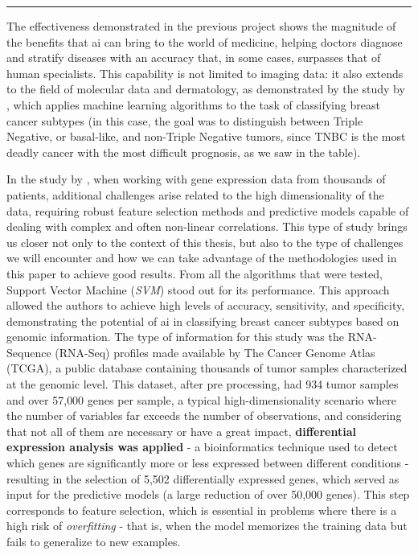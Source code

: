 \noindent\rule{\linewidth}{0.4pt}

The effectiveness demonstrated in the previous project shows the magnitude of
the benefits that \gls{ai} can bring to the world of medicine, helping doctors
diagnose and stratify diseases with an accuracy that, in some cases, surpasses
that of human specialists. This capability is not limited to imaging data: it
also extends to the field of molecular data and dermatology, as demonstrated by
the study by \textcite{bca_subtypes_with_ml_Wu_2021}, which applies machine
learning algorithms to the task of classifying breast cancer subtypes (in this
case, the goal was to distinguish between Triple Negative, or basal-like, and
non-Triple Negative tumors, since TNBC is the most deadly cancer with the most
difficult prognosis, as we saw in the table).

In the study by \textcite{bca_subtypes_with_ml_Wu_2021}, when working with gene
expression data from thousands of patients, additional challenges arise related
to the high dimensionality of the data, requiring robust feature selection
methods and predictive models capable of dealing with complex and often
non-linear correlations. This type of study brings us closer not only to the
context of this thesis, but also to the type of challenges we will encounter
and how we can take advantage of the methodologies used in this paper to
achieve good results. From all the algorithms that were tested, Support Vector
Machine (\textit{SVM}) stood out for its performance. This approach allowed the
authors to achieve high levels of accuracy, sensitivity, and specificity,
demonstrating the potential of \gls{ai} in classifying breast cancer subtypes
based on genomic information. The type of information for this study was the
RNA-Sequence (RNA-Seq) profiles made available by The Cancer Genome Atlas
(TCGA), a public database containing thousands of tumor samples characterized
at the genomic level. This dataset, after pre processing, had 934 tumor samples
and over 57{,}000 genes per sample, a typical high-dimensionality scenario
where the number of variables far exceeds the number of observations, and
considering that not all of them are necessary or have a great impact,
\textbf{differential expression analysis was applied} - a bioinformatics
technique used to detect which genes are significantly more or less expressed
between different conditions - resulting in the selection of 5{,}502
differentially expressed genes, which served as input for the predictive models
(a large reduction of over 50{,}000 genes). This step corresponds to feature
selection, which is essential in problems where there is a high risk of
\textit{overfitting} - that is, when the model memorizes the training data but
fails to generalize to new examples.

